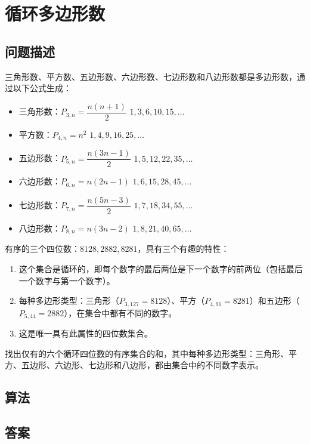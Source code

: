 \section{循环多边形数}
\subsection{问题描述}
\begin{tcolorbox}
	三角形数、平方数、五边形数、六边形数、七边形数和八边形数都是多边形数，通过以下公式生成：

	\begin{itemize}
		\item 三角形数：$P_{3,n} = \dfrac{n(n+1)}{2}$ \quad $1, 3, 6, 10, 15, \dots$
		\item 平方数：$P_{4,n} = n^2$ \quad $1, 4, 9, 16, 25, \dots$
		\item 五边形数：$P_{5,n} = \dfrac{n(3n-1)}{2}$ \quad $1, 5, 12, 22, 35, \dots$
		\item 六边形数：$P_{6,n} = n(2n-1)$ \quad $1, 6, 15, 28, 45, \dots$
		\item 七边形数：$P_{7,n} = \dfrac{n(5n-3)}{2}$ \quad $1, 7, 18, 34, 55, \dots$
		\item 八边形数：$P_{8,n} = n(3n-2)$ \quad $1, 8, 21, 40, 65, \dots$
	\end{itemize}

	有序的三个四位数：$8128, 2882, 8281$，具有三个有趣的特性：

	\begin{enumerate}
		\item 这个集合是循环的，即每个数字的最后两位是下一个数字的前两位（包括最后一个数字与第一个数字）。
		\item 每种多边形类型：三角形（$P_{3,127} = 8128$）、平方（$P_{4,91} = 8281$）和五边形（$P_{5,44} = 2882$），在集合中都有不同的数字。
		\item 这是唯一具有此属性的四位数集合。
	\end{enumerate}

	找出仅有的六个循环四位数的有序集合的和，其中每种多边形类型：三角形、平方、五边形、六边形、七边形和八边形，都由集合中的不同数字表示。

\end{tcolorbox}

\subsection{算法}

\subsection{答案}

